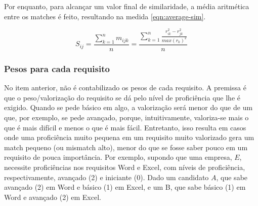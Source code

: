 \documentclass[preprint,12pt]{elsarticle}
\begin{document}
Por enquanto, para alcançar um valor final de similaridade, a média aritmética entre os matches é feito, resultando na medida \ref{eqn:average-sim}.

\begin{equation}
\label{eqn:average-sim}
S_{ij} =  \frac{\sum_{k=1}^n m_{ijk}}
              {n} = 
          \frac{\sum_{k=1}^n \frac{r_{ik}^2 - r_{jk}^2}{max(r_k)^2}}
              {n}
\end{equation}

\subsubsection{Pesos para cada requisito}
\label{sssec:weights}


   
No item anterior, não é contabilizado os pesos de cada requisito. A premissa é que o peso/valorização do requisito se dá pelo nível de proficiência que lhe é exigido. Quando se pede básico em algo, a valorização será menor do que de um que, por exemplo, se pede avançado, porque, intuitivamente, valoriza-se mais o que é mais difícil e menos o que é mais fácil. Entretanto, isso resulta em casos onde uma proficiência muito pequena em um requisito muito valorizado gera um match pequeno (ou mismatch alto), menor do que se fosse saber pouco em um requisito de pouca importância. Por exemplo, supondo que uma empresa, $E$, necessite proficiências nos requisitos Word e Excel, com níveis de proficiência, respectivamente, avançado (2) e iniciante (0). Dado um candidato $A$, que sabe avançado (2) em Word e básico (1) em Excel, e um B, que sabe básico (1) em Word e avançado (2) em Excel.
\end{document}
